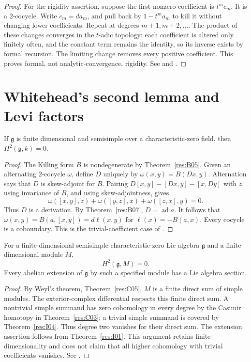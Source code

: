 \begin{proof}
For the rigidity assertion, suppose the first nonzero coefficient is
\(t^m c_m\). It is a \(2\)-cocycle. Write \(c_m=da_m\), and pull back
by \(1-t^m a_m\) to kill it without changing lower coefficients.
Repeat at degrees \(m+1,m+2,\ldots\). The product of these changes
converges in the \(t\)-adic topology: each coefficient is altered
only finitely often, and the constant term remains the identity,
so its inverse exists by formal recursion. The limiting change
removes every positive coefficient.
This proves formal, not analytic-convergence, rigidity.
See \cite[Section 48.1]{etingof} and \cite[Sections 1 and 3]{fialowski}.
\end{proof}

\section{Whitehead's second lemma and Levi factors}

\begin{theorem}\label{res:I04}
If \(\mathfrak g\) is finite dimensional and semisimple over a
characteristic-zero field, then \(H^2(\mathfrak g,k)=0\).
\end{theorem}
\begin{proof}
The Killing form \(B\) is nondegenerate by Theorem~\ref{res:B05}.
Given an alternating \(2\)-cocycle \(\omega\), define \(D\) uniquely by
\(\omega(x,y)=B(Dx,y)\). Alternation says that \(D\) is skew-adjoint
for \(B\). Pairing
\(D[x,y]-[Dx,y]-[x,Dy]\) with \(z\), using invariance of \(B\),
and using skew-adjointness, gives
\[
 \omega([x,y],z)+\omega([y,z],x)+\omega([z,x],y)=0.
\]
Thus \(D\) is a derivation. By Theorem~\ref{res:B07}, \(D=\operatorname{ad}a\).
It follows that
\(\omega(x,y)=B(a,[x,y])=d\ell(x,y)\) for
\(\ell(x)=-B(a,x)\). Every cocycle is a coboundary.
This is the trivial-coefficient case of
\cite[Corollary 7.8.12]{weibel}.
\end{proof}

\begin{theorem}\label{res:I05}
For a finite-dimensional semisimple characteristic-zero Lie algebra
\(\mathfrak g\) and a finite-dimensional module \(M\),
\[
 H^2(\mathfrak g,M)=0.
\]
Every abelian extension of \(\mathfrak g\) by such a specified module
has a Lie algebra section.
\end{theorem}
\begin{proof}
By Weyl's theorem, Theorem~\ref{res:C05}, \(M\) is a finite direct
sum of simple modules. The exterior-complex differential respects
this finite direct sum. A nontrivial simple summand has zero
cohomology in every degree by the Casimir homotopy in
Theorem~\ref{res:C03}; a trivial simple summand is covered by
Theorem~\ref{res:I04}. Thus degree two vanishes for their direct sum.
The extension assertion follows from Theorem~\ref{res:I01}.
This argument retains finite-dimensionality and does not claim
that all higher cohomology with trivial coefficients vanishes.
See \cite[Corollary 7.8.12]{weibel}.
\end{proof}

